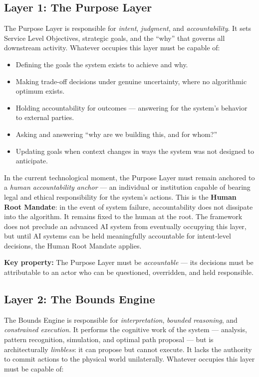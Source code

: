 \documentclass[12pt]{article}
\begin{document}
\subsection{Layer 1: The Purpose Layer}

The Purpose Layer is responsible for \textit{intent}, \textit{judgment}, and \textit{accountability}. It sets Service Level Objectives, strategic goals, and the ``why'' that governs all downstream activity. Whatever occupies this layer must be capable of:

\begin{itemize}[noitemsep]
    \item Defining the goals the system exists to achieve and why.
    \item Making trade-off decisions under genuine uncertainty, where no algorithmic optimum exists.
    \item Holding accountability for outcomes --- answering for the system's behavior to external parties.
    \item Asking and answering ``why are we building this, and for whom?''
    \item Updating goals when context changes in ways the system was not designed to anticipate.
\end{itemize}

In the current technological moment, the Purpose Layer must remain anchored to a \textit{human accountability anchor} --- an individual or institution capable of bearing legal and ethical responsibility for the system's actions. This is the \textbf{Human Root Mandate}: in the event of system failure, accountability does not dissipate into the algorithm. It remains fixed to the human at the root. The framework does not preclude an advanced AI system from eventually occupying this layer, but until AI systems can be held meaningfully accountable for intent-level decisions, the Human Root Mandate applies.

\textbf{Key property:} The Purpose Layer must be \textit{accountable} --- its decisions must be attributable to an actor who can be questioned, overridden, and held responsible.

\subsection{Layer 2: The Bounds Engine}

The Bounds Engine is responsible for \textit{interpretation}, \textit{bounded reasoning}, and \textit{constrained execution}. It performs the cognitive work of the system --- analysis, pattern recognition, simulation, and optimal path proposal --- but is architecturally \textit{limbless}: it can propose but cannot execute. It lacks the authority to commit actions to the physical world unilaterally. Whatever occupies this layer must be capable of:
\end{document}
